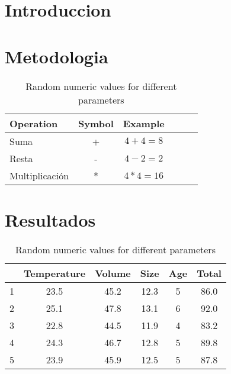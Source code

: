 \documentclass[a4paper,12pt,twoside]{article}
\begin{document}

\newpage

\pagestyle{toc}

\tableofcontents
\listoffigures
\listoftables
\lstlistoflistings
\pagebreak

\pagestyle{main}

\section{Introduccion}

\pagebreak

\section{Metodologia}

\begin{table}[H]
    \centering
    \begin{tabular}{|lccccc|}
        \hline
        \rowcolor{orange} \textbf{Operation} & \textbf{Symbol} & \textbf{Example} & & & \\ 
        \hline
        Suma & + & $4 + 4 = 8$ & & & \\
        \hline
        Resta & - & $4 - 2 = 2$ & & & \\
        \hline
        Multiplicación & * & $4 * 4 = 16$ & & & \\
        \hline
    \end{tabular}
    \caption{Random numeric values for different parameters}
    \label{tab:aritmetic_operations}
\end{table}

\pagebreak

\section{Resultados}

\begin{table}[H]
    \centering
    \begin{tabular}{|cccccc|}
        \hline
        \rowcolor{orange} & Temperature & Volume & Size & Age & Total \\
        \hline
        1 & 23.5 & 45.2 & 12.3 & 5 & 86.0 \\
        \hline
        2 & 25.1 & 47.8 & 13.1 & 6 & 92.0 \\
        \hline
        3 & 22.8 & 44.5 & 11.9 & 4 & 83.2 \\
        \hline
        4 & 24.3 & 46.7 & 12.8 & 5 & 89.8 \\
        \hline
        5 & 23.9 & 45.9 & 12.5 & 5 & 87.8 \\
        \hline
    \end{tabular}
    \caption{Random numeric values for different parameters}
    \label{tab:random_values}
\end{table}
\end{document}
